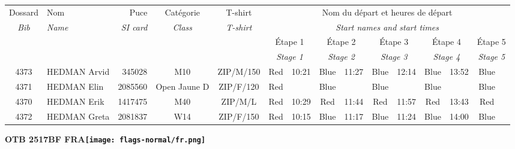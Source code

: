 \documentclass{report}
\begin{document}
  \begin{longtable}{|c|l|r|c|c|*{5}{cc|}}
    Dossard & Nom  & Puce    & Catégorie & T-shirt & \multicolumn{10}{c|}{Nom du départ et heures de départ} \\
    \itshape Bib     & \itshape Name & \itshape SI card & \itshape Class  & \itshape  T-shirt  & \multicolumn{10}{c|}{\itshape Start names and start times} \\
    \hline
    & & & & & \multicolumn{2}{c|}{Étape 1} & \multicolumn{2}{c|}{Étape 2} & \multicolumn{2}{c|}{Étape 3} & \multicolumn{2}{c|}{Étape 4} & \multicolumn{2}{c|}{Étape 5} \\
    & & & & & \multicolumn{2}{c|}{\itshape Stage 1} & \multicolumn{2}{c|}{\itshape Stage 2} & \multicolumn{2}{c|}{\itshape Stage 3} & \multicolumn{2}{c|}{\itshape Stage 4} & \multicolumn{2}{c|}{\itshape Stage 5} \\
    \hline
    4373 & HEDMAN Arvid & 345028 & M10 & ZIP/M/150 & Red & 10:21 & Blue & 11:27 & Blue & 12:14 & Blue & 13:52 & Blue &  \\
    4371 & HEDMAN Elin & 2085560 & Open Jaune D & ZIP/F/120 & Red &   & Blue &   & Blue &   & Blue &   & Blue &  \\
    4370 & HEDMAN Erik & 1417475 & M40 & ZIP/M/L & Red & 10:29 & Red & 11:44 & Red & 11:57 & Red & 13:43 & Red &  \\
    4372 & HEDMAN Greta & 2081837 & W14 & ZIP/F/150 & Red & 10:15 & Blue & 11:17 & Blue & 11:24 & Blue & 14:00 & Blue &  \\
  \end{longtable}
\newpage
  \Huge \centering \bfseries OTB 2517BF FRA\normalfont \footnotesize \sffamily \hfill \texttt{[image: flags-normal/fr.png]} \newline 
\end{document}
